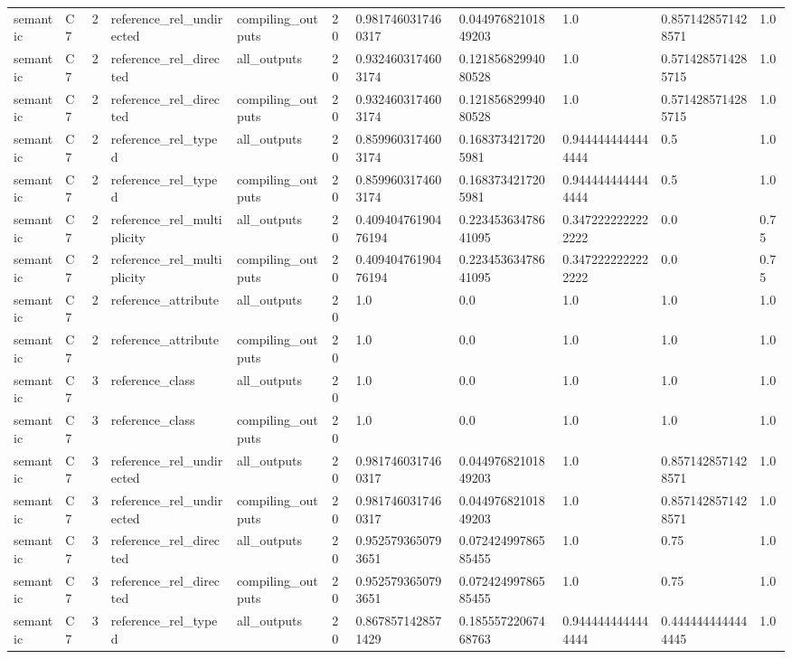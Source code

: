 \begin{tabular}{lllllllllll}
semantic & C7 & 2 & reference\_rel\_undirected & compiling\_outputs & 20 & 0.9817460317460317 & 0.04497682101849203 & 1.0 & 0.8571428571428571 & 1.0 \\
semantic & C7 & 2 & reference\_rel\_directed & all\_outputs & 20 & 0.9324603174603174 & 0.12185682994080528 & 1.0 & 0.5714285714285715 & 1.0 \\
semantic & C7 & 2 & reference\_rel\_directed & compiling\_outputs & 20 & 0.9324603174603174 & 0.12185682994080528 & 1.0 & 0.5714285714285715 & 1.0 \\
semantic & C7 & 2 & reference\_rel\_typed & all\_outputs & 20 & 0.8599603174603174 & 0.1683734217205981 & 0.9444444444444444 & 0.5 & 1.0 \\
semantic & C7 & 2 & reference\_rel\_typed & compiling\_outputs & 20 & 0.8599603174603174 & 0.1683734217205981 & 0.9444444444444444 & 0.5 & 1.0 \\
semantic & C7 & 2 & reference\_rel\_multiplicity & all\_outputs & 20 & 0.40940476190476194 & 0.22345363478641095 & 0.3472222222222222 & 0.0 & 0.75 \\
semantic & C7 & 2 & reference\_rel\_multiplicity & compiling\_outputs & 20 & 0.40940476190476194 & 0.22345363478641095 & 0.3472222222222222 & 0.0 & 0.75 \\
semantic & C7 & 2 & reference\_attribute & all\_outputs & 20 & 1.0 & 0.0 & 1.0 & 1.0 & 1.0 \\
semantic & C7 & 2 & reference\_attribute & compiling\_outputs & 20 & 1.0 & 0.0 & 1.0 & 1.0 & 1.0 \\
semantic & C7 & 3 & reference\_class & all\_outputs & 20 & 1.0 & 0.0 & 1.0 & 1.0 & 1.0 \\
semantic & C7 & 3 & reference\_class & compiling\_outputs & 20 & 1.0 & 0.0 & 1.0 & 1.0 & 1.0 \\
semantic & C7 & 3 & reference\_rel\_undirected & all\_outputs & 20 & 0.9817460317460317 & 0.04497682101849203 & 1.0 & 0.8571428571428571 & 1.0 \\
semantic & C7 & 3 & reference\_rel\_undirected & compiling\_outputs & 20 & 0.9817460317460317 & 0.04497682101849203 & 1.0 & 0.8571428571428571 & 1.0 \\
semantic & C7 & 3 & reference\_rel\_directed & all\_outputs & 20 & 0.9525793650793651 & 0.07242499786585455 & 1.0 & 0.75 & 1.0 \\
semantic & C7 & 3 & reference\_rel\_directed & compiling\_outputs & 20 & 0.9525793650793651 & 0.07242499786585455 & 1.0 & 0.75 & 1.0 \\
semantic & C7 & 3 & reference\_rel\_typed & all\_outputs & 20 & 0.8678571428571429 & 0.18555722067468763 & 0.9444444444444444 & 0.4444444444444445 & 1.0 \\

\end{tabular}
